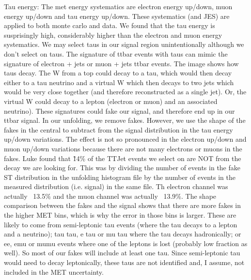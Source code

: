 Tau energy: The met energy systematics are electron energy up/down, muon energy up/down and tau energy
up/down. These systematics (and JES) are applied to both monte carlo and data. We found that the tau energy is
susprisingly high, considerably higher than the electron and muon energy systematics. We may select taus in
our signal region unintentionally although we don't select on taus. The signature of ttbar events with taus
can mimic the signature of electron + jets or muon + jets ttbar events. The image shows how taus decay. The W
from a top could decay to a tau, which would then decay either to a tau neutrino and a virtual W which then
decays to two jets which would be very close together (and therefore reconstructed as a single jet). Or, the
virtual W could decay to a lepton (electron or muon) and an associated neutrino). These signatures could fake
our signal, and therefore end up in our ttbar signal. In our unfolding, we remove fakes. However, we use the
shape of the fakes in the central to subtract from the signal distribution in the tau energy up/down
variations. The effect is not so pronounced in the electron up/down and muon up/down variations because there
are not many electrons or muons in the fakes. Luke found that \~14\% of the TTJet events we select on are NOT
from the decay we are looking for. This was by dividing the number of events in the fake ST distribution in
the unfolding histogram file by the number of events in the measured distribution (i.e. signal) in the same
file. Th electron channel was actually ~13.5\% and the muon channel was actually ~13.9\%. The shape
comparison between the fakes and the signal shows that there are more fakes in the higher MET bins, which is
why the error in those bins is larger. These are likely to come from semi-leptonic tau events (where the tau
decays to a lepton and a neutrino); tau tau, e tau or mu tau where the tau decays hadronically; or ee, emu or mumu events where one of the leptons is lost (probably low fraction as well). So most of our fakes will include at least one tau. Since semi-leptonic tau would need to
decay leptonically, these taus are not identified and, I assume, not included in the MET uncertainty.

